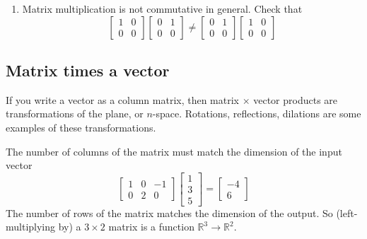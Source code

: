 \documentclass{scrartcl}
\providecommand{\R}{\mathbb{R}}
\begin{document}
\begin{enumerate}
\[\begin{bmatrix}
    \end{bmatrix}
    + d
    \begin{bmatrix}
      0 & -1 \\ 1 & 0
    \end{bmatrix}
  \right)
  \]
  gives the correct product.
  (Hint: Note
  $\left[\begin{smallmatrix}
    1 & 0 \\ 0 & 1
  \end{smallmatrix}\right]$
  is the identity matrix. Then it suffices to show
  $\left[
  \begin{smallmatrix}
    0 & -1 \\ 1 & 0
  \end{smallmatrix}  \right]^2 = -I
  $. The rest follows by linearity.)
\item Matrix multiplication is not commutative in general. Check that
  \[
    \begin{bmatrix}
      1 & 0 \\ 0 &0
    \end{bmatrix}
    \begin{bmatrix}
      0 & 1 \\ 0 & 0
    \end{bmatrix}
    \neq
    \begin{bmatrix}
      0 & 1 \\ 0 & 0
    \end{bmatrix}
    \begin{bmatrix}
      1 & 0 \\ 0 & 0
    \end{bmatrix}
\]
\end{enumerate}
\subsection{Matrix times a vector}\label{matrix times a vector}
If you write a vector as a column matrix, then matrix $\times$ vector products
are transformations of the plane, or $n$-space. Rotations, reflections,
dilations are some examples of these transformations.

The number of columns of the matrix must match the dimension of the input vector
\[
  \begin{bmatrix}
   1 & 0 & -1  \\
   0 & 2 & 0
  \end{bmatrix}
  \begin{bmatrix}
    1 \\ 3 \\ 5
  \end{bmatrix}
  =
  \begin{bmatrix}
    -4 \\ 6
  \end{bmatrix}
\]
The number of rows of the matrix matches the dimension of the output. So
(left-multiplying by) a
$3\times 2$ matrix is a function $\R^3\to\R^2$.
\end{document}
